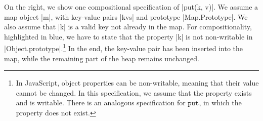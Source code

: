 On the right, we show one compositional specification of \jsinline|put(k, v)|. 
We assume a map object \jsinline|m|, with key-value pairs \jsinline|kvs| and prototype \jsinline|Map.Prototype|. We also assume that \jsinline|k| is a valid key not already in the map. For compositionality, highlighted in blue, we have to state that the property \jsinline|k| is not non-writable in \jsinline|Object.prototype|.\footnote{In JavaScript, object properties can be non-writable, meaning that their value cannot be changed. In this specification, we assume that the property exists and is writable. There is an analogous specification for $\mathtt{put}$, in which the property does not exist.}
In the end, the key-value pair has been inserted into the map, while the remaining part of the heap remains unchanged.


